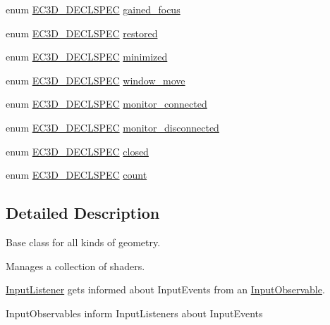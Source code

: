 \begin{DoxyCompactItemize}
\item 
enum \mbox{\hyperlink{_common_8h_aac42573e202ca3dd4d259c81691e2369}{E\+C3\+D\+\_\+\+D\+E\+C\+L\+S\+P\+EC}} \mbox{\hyperlink{namespaceec_a1e2dd185f2ea6b2729b32fec30917a0e}{gained\+\_\+focus}}
\item 
enum \mbox{\hyperlink{_common_8h_aac42573e202ca3dd4d259c81691e2369}{E\+C3\+D\+\_\+\+D\+E\+C\+L\+S\+P\+EC}} \mbox{\hyperlink{namespaceec_af316093f3fa4161f332a168bd91d598e}{restored}}
\item 
enum \mbox{\hyperlink{_common_8h_aac42573e202ca3dd4d259c81691e2369}{E\+C3\+D\+\_\+\+D\+E\+C\+L\+S\+P\+EC}} \mbox{\hyperlink{namespaceec_a5886b41b06c3a2522782c1129b38569d}{minimized}}
\item 
enum \mbox{\hyperlink{_common_8h_aac42573e202ca3dd4d259c81691e2369}{E\+C3\+D\+\_\+\+D\+E\+C\+L\+S\+P\+EC}} \mbox{\hyperlink{namespaceec_a435bfb057b6ec7278b405d423194057b}{window\+\_\+move}}
\item 
enum \mbox{\hyperlink{_common_8h_aac42573e202ca3dd4d259c81691e2369}{E\+C3\+D\+\_\+\+D\+E\+C\+L\+S\+P\+EC}} \mbox{\hyperlink{namespaceec_a2a1f0b9f84e0ccf8a264a846b5ca23ff}{monitor\+\_\+connected}}
\item 
enum \mbox{\hyperlink{_common_8h_aac42573e202ca3dd4d259c81691e2369}{E\+C3\+D\+\_\+\+D\+E\+C\+L\+S\+P\+EC}} \mbox{\hyperlink{namespaceec_ac7da3b2ff7c2bb148e07798a9e8e51f4}{monitor\+\_\+disconnected}}
\item 
enum \mbox{\hyperlink{_common_8h_aac42573e202ca3dd4d259c81691e2369}{E\+C3\+D\+\_\+\+D\+E\+C\+L\+S\+P\+EC}} \mbox{\hyperlink{namespaceec_a50f9b2ea9dbfffe311ceb6f857573272}{closed}}
\item 
enum \mbox{\hyperlink{_common_8h_aac42573e202ca3dd4d259c81691e2369}{E\+C3\+D\+\_\+\+D\+E\+C\+L\+S\+P\+EC}} \mbox{\hyperlink{namespaceec_a4dc8d59c4e90842e057344aefde0efbd}{count}}
\end{DoxyCompactItemize}


\subsection{Detailed Description}
Base class for all kinds of geometry. 

Manages a collection of shaders.

\mbox{\hyperlink{classec_1_1_input_listener}{Input\+Listener}} gets informed about Input\+Events from an \mbox{\hyperlink{classec_1_1_input_observable}{Input\+Observable}}.

Input\+Observables inform Input\+Listeners about Input\+Events


